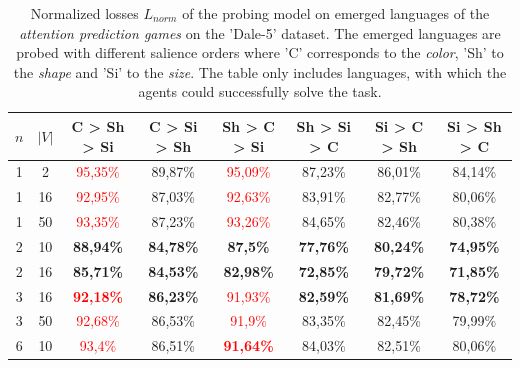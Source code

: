 \begin{table}[ht]
    \centering
    \begin{tabular}{cc|c|c|c|c|c|c}
        \toprule
        $n$ & $|V|$ & \textbf{C > Sh > Si}              & \textbf{C > Si > Sh} & \textbf{Sh > C > Si}              & \textbf{Sh > Si > C} & \textbf{Si > C > Sh} & \textbf{Si > Sh > C} \\\midrule
        {1} & {2}   & \textcolor{red}{95,35\%}          & {89,87\%}            & \textcolor{red}{95,09\%}          & {87,23\%}            & {86,01\%}            & {84,14\%}            \\
        {1} & {16}  & \textcolor{red}{92,95\%}          & {87,03\%}            & \textcolor{red}{92,63\%}          & {83,91\%}            & {82,77\%}            & {80,06\%}            \\
        {1} & {50}  & \textcolor{red}{93,35\%}          & {87,23\%}            & \textcolor{red}{93,26\%}          & {84,65\%}            & {82,46\%}            & {80,38\%}            \\
        {2} & {10}  & \textbf{88,94\%}                  & \textbf{84,78\%}     & \textbf{87,5\%}                   & \textbf{77,76\%}     & \textbf{80,24\%}     & \textbf{74,95\%}     \\
        {2} & {16}  & \textbf{85,71\%}                  & \textbf{84,53\%}     & \textbf{82,98\%}                  & \textbf{72,85\%}     & \textbf{79,72\%}     & \textbf{71,85\%}     \\
        {3} & {16}  & \textcolor{red}{\textbf{92,18\%}} & \textbf{86,23\%}     & \textcolor{red}{91,93\%}          & \textbf{82,59\%}     & \textbf{81,69\%}     & \textbf{78,72\%}     \\
        {3} & {50}  & \textcolor{red}{92,68\%}          & {86,53\%}            & \textcolor{red}{91,9\%}           & {83,35\%}            & {82,45\%}            & {79,99\%}            \\
        {6} & {10}  & \textcolor{red}{93,4\%}           & {86,51\%}            & \textcolor{red}{\textbf{91,64\%}} & {84,03\%}            & {82,51\%}            & {80,06\%}            \\
        \bottomrule
    \end{tabular}
    \caption{Normalized losses $L_{norm}$ of the probing model on emerged languages of the \emph{attention prediction games} on the 'Dale-5' dataset. The emerged languages are probed with different salience orders where 'C' corresponds to the \emph{color}, 'Sh' to the \emph{shape} and 'Si' to the \emph{size}. The table only includes languages, with which the agents could successfully solve the task.}
    \label{tab:probing:attention-predictor:dale-5}
\end{table}

